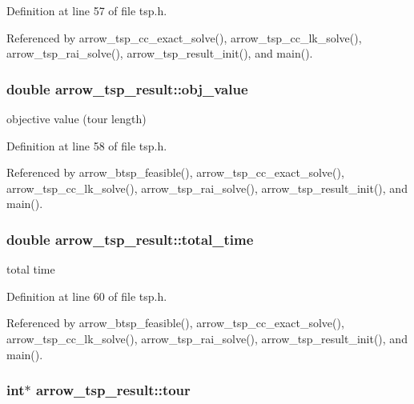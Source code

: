 Definition at line 57 of file tsp.h.

Referenced by arrow\_\-tsp\_\-cc\_\-exact\_\-solve(), arrow\_\-tsp\_\-cc\_\-lk\_\-solve(), arrow\_\-tsp\_\-rai\_\-solve(), arrow\_\-tsp\_\-result\_\-init(), and main().\hypertarget{structarrow__tsp__result_f0fae9756e4c924517addf05988cfcb9}{
\subsubsection[{obj\_\-value}]{\setlength{\rightskip}{0pt plus 5cm}double {\bf arrow\_\-tsp\_\-result::obj\_\-value}}}
\label{structarrow__tsp__result_f0fae9756e4c924517addf05988cfcb9}


objective value (tour length) 

Definition at line 58 of file tsp.h.

Referenced by arrow\_\-btsp\_\-feasible(), arrow\_\-tsp\_\-cc\_\-exact\_\-solve(), arrow\_\-tsp\_\-cc\_\-lk\_\-solve(), arrow\_\-tsp\_\-rai\_\-solve(), arrow\_\-tsp\_\-result\_\-init(), and main().\hypertarget{structarrow__tsp__result_82ea7aa0320d932892602d34339a9276}{
\subsubsection[{total\_\-time}]{\setlength{\rightskip}{0pt plus 5cm}double {\bf arrow\_\-tsp\_\-result::total\_\-time}}}
\label{structarrow__tsp__result_82ea7aa0320d932892602d34339a9276}


total time 

Definition at line 60 of file tsp.h.

Referenced by arrow\_\-btsp\_\-feasible(), arrow\_\-tsp\_\-cc\_\-exact\_\-solve(), arrow\_\-tsp\_\-cc\_\-lk\_\-solve(), arrow\_\-tsp\_\-rai\_\-solve(), arrow\_\-tsp\_\-result\_\-init(), and main().\hypertarget{structarrow__tsp__result_48433b03146d6ca3423a555ea2139d52}{
\subsubsection[{tour}]{\setlength{\rightskip}{0pt plus 5cm}int$\ast$ {\bf arrow\_\-tsp\_\-result::tour}}}
\label{structarrow__tsp__result_48433b03146d6ca3423a555ea2139d52}


